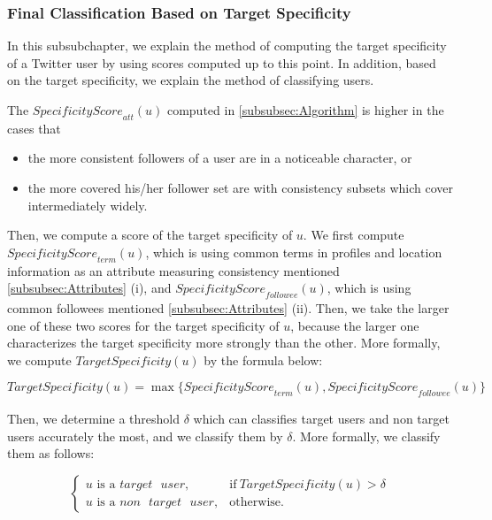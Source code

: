 
\subsubsection{Final Classification Based on Target Specificity}
\label{subsubsec:Final Classification}

In this subsubchapter, we explain the method of computing the target
specificity of a Twitter user by using scores computed up to this
point.  In addition, based on the target specificity, we explain the
method of classifying users.

The $\mathit{SpecificityScore}_{{\mathit{att}}}(u)$ computed in
\ref{subsubsec:Algorithm} is higher in the cases that

\begin{itemize}
\item the more consistent followers of a user are in a noticeable
      character, or
\item the more covered his/her follower set are with consistency
      subsets which cover intermediately widely.
\end{itemize}

Then, we compute a score of the target specificity of $u$. We first
compute $\mathit{SpecificityScore}_{{\mathit{term}}}(u)$, which is using
common terms in profiles and location information as an attribute
measuring consistency mentioned \ref{subsubsec:Attributes} (i), and
$\mathit{SpecificityScore}_{{\mathit{followee}}}(u)$, which is using
common followees mentioned \ref{subsubsec:Attributes} (ii).  Then, we
take the larger one of these two scores for the target specificity of
$u$, because the larger one characterizes the target specificity more
strongly than the other.  More formally, we compute
$\mathit{TargetSpecificity}(u)$ by the formula below:

\vspace{-4ex}
\[
 \mathit{TargetSpecificity}(u) = \max \{
 \mathit{SpecificityScore}_{{\mathit{term}}}(u),
 \mathit{SpecificityScore}_{{\mathit{followee}}}(u)\}
\]
\vspace{-4ex}

Then, we determine a threshold $\delta$ which can classifies target
users and non target users accurately the most, and we classify them by
$\delta$.  More formally, we classify them as follows:

\vspace{-1ex}
\[
\begin{cases}
u\mbox{ is a } \mathit{target}\mbox{ }\mathit{user}, & \mbox{if}\
\mathit{TargetSpecificity}(u) > \delta \\
u\mbox{ is a }\mathit{non}\mbox{ }\mathit{target}\mbox{ }\mathit{user}, & \mbox{otherwise}.
\end{cases}
\]
\vspace{-2ex}

